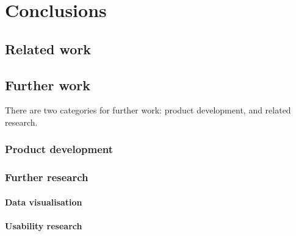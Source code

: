 \chapter{Conclusions}\label{chap:conclusions}





\cite{cummins2014pip-db}
\cite{cummins2014migrating}


\section{Related work}\label{sec:related-work}


\section{Further work}\label{sec:further-work}

There are two categories for further work: product development, and
related research.

\subsection{Product development}


\subsection{Further research}

\subsubsection*{Data visualisation}

\cite{saraiya2005insight}

\subsubsection*{Usability research}

